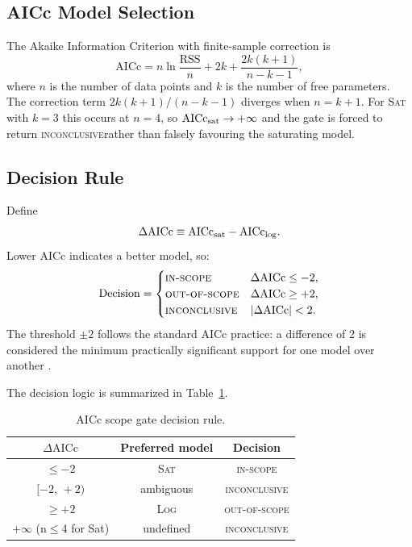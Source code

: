 \documentclass[11pt,letterpaper]{article}
\newcommand{\dAICc}{\Delta\mathrm{AICc}}
\newcommand{\modeltag}[1]{\textsc{#1}}
\newcommand{\inscope}{\textsc{in-scope}}
\newcommand{\outscope}{\textsc{out-of-scope}}
\newcommand{\inconclusive}{\textsc{inconclusive}}
\begin{document}
\subsection{AICc Model Selection}

The Akaike Information Criterion with finite-sample correction is
\begin{equation}
  \mathrm{AICc} = n\ln\!\frac{\mathrm{RSS}}{n} + 2k + \frac{2k(k+1)}{n-k-1},
  \label{eq:aicc}
\end{equation}
where $n$ is the number of data points and $k$ is the number of free
parameters.  The correction term $2k(k+1)/(n-k-1)$ diverges when
$n = k + 1$.  For \modeltag{Sat} with $k=3$ this occurs at $n = 4$, so
$\mathrm{AICc}_{\rm sat} \to +\infty$ and the gate is forced to return
\inconclusive rather than falsely favouring the saturating model.

\subsection{Decision Rule}

Define
\begin{equation}
  \dAICc \equiv \mathrm{AICc}_{\rm sat} - \mathrm{AICc}_{\rm log}.
  \label{eq:daicc}
\end{equation}
Lower AICc indicates a better model, so:
\begin{equation}
  \text{Decision} = \begin{cases}
    \inscope    & \dAICc \le -2, \\
    \outscope   & \dAICc \ge +2, \\
    \inconclusive & |\dAICc| < 2.
  \end{cases}
  \label{eq:rule}
\end{equation}
The threshold $\pm 2$ follows the standard AICc practice: a difference of 2
is considered the minimum practically significant support for one model over
another \cite{Burnham2002}.

The decision logic is summarized in Table~\ref{tab:rule}.

\begin{table}[h]
  \centering
  \caption{AICc scope gate decision rule.}
  \label{tab:rule}
  \begin{tabular}{ccc}
    \toprule
    $\dAICc$ & Preferred model & Decision \\
    \midrule
    $\le -2$          & \modeltag{Sat} & \inscope \\
    $[-2,\,+2)$       & ambiguous      & \inconclusive \\
    $\ge +2$          & \modeltag{Log} & \outscope \\
    $+\infty$ (n$\le$4 for Sat) & undefined & \inconclusive \\
    \bottomrule
  \end{tabular}
\end{table}
\end{document}
